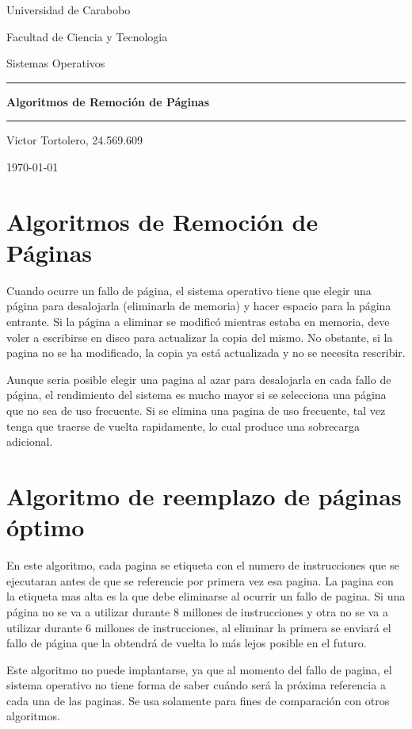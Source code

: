 \documentclass{article}
\begin{document}
\centerline{Universidad de Carabobo}
\centerline{Facultad de Ciencia y Tecnologia}
\centerline{Sistemas Operativos}
\vspace{7cm}
\begin{centering}
	\hrule 	\vspace{0.4cm}
	{ \Huge \bfseries Algoritmos de Remoción de Páginas \\[0.4cm] }
	\hrule \vfill
\end{centering}
\vfill
\centerline{Victor Tortolero, 24.569.609}
\centerline{\today}
\newpage
	
{\centering \section*{Algoritmos de Remoción de Páginas}}
Cuando ocurre un fallo de página, el sistema operativo tiene que elegir una página para desalojarla (eliminarla de memoria) y hacer espacio
para la página entrante. Si la página a eliminar se modificó mientras estaba en memoria, deve voler a escribirse en disco para
actualizar la copia del mismo. No obstante, si la pagina no se ha modificado, la copia ya está actualizada y no se necesita rescribir.

Aunque seria posible elegir una pagina al azar para desalojarla en cada fallo de página, el rendimiento del sistema es mucho mayor si se selecciona una página que no sea de uso frecuente. Si se elimina una pagina de uso frecuente, tal vez tenga que traerse de vuelta rapidamente, lo cual produce una sobrecarga adicional.

{\centering \section*{Algoritmo de reemplazo de páginas óptimo}}
En este algoritmo, cada pagina se etiqueta con el numero de instrucciones que se ejecutaran antes de que se referencie
por primera vez esa pagina. La pagina con la etiqueta mas alta es la que debe eliminarse al ocurrir un fallo de pagina.
Si una página no se va a utilizar durante 8 millones de instrucciones y otra no se va a utilizar durante 6 millones de instrucciones, 
al eliminar la primera se enviará el fallo de página que la obtendrá de vuelta lo más lejos posible en el futuro.

Este algoritmo no puede implantarse, ya que al momento del fallo de pagina, el sistema operativo no tiene forma de saber cuándo será la próxima referencia a cada una de las paginas. Se usa solamente para fines de comparación con otros algoritmos.
\end{document}
